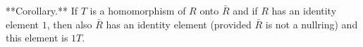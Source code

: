 **Corollary.** If $T$ is a homomorphism of $R$ onto $\bar{R}$ and if $R$ has an identity element $1$, then also $\bar{R}$ has an identity element (provided $\bar{R}$ is not a nullring) and this element is $1T$.
